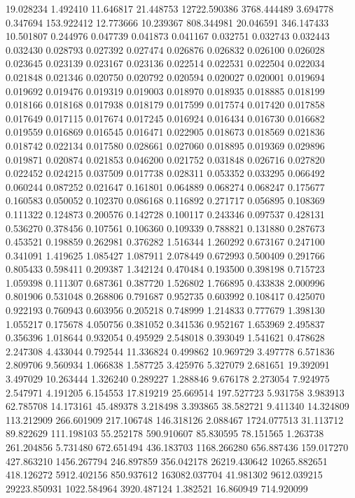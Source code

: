 19.028234
1.492410
11.646817
21.448753
12722.590386
3768.444489
3.694778
0.347694
153.922412
12.773666
10.239367
808.344981
20.046591
346.147433
10.501807
0.244976
0.047739
0.041873
0.041167
0.032751
0.032743
0.032443
0.032430
0.028793
0.027392
0.027474
0.026876
0.026832
0.026100
0.026028
0.023645
0.023139
0.023167
0.023136
0.022514
0.022531
0.022504
0.022034
0.021848
0.021346
0.020750
0.020792
0.020594
0.020027
0.020001
0.019694
0.019692
0.019476
0.019319
0.019003
0.018970
0.018935
0.018885
0.018199
0.018166
0.018168
0.017938
0.018179
0.017599
0.017574
0.017420
0.017858
0.017649
0.017115
0.017674
0.017245
0.016924
0.016434
0.016730
0.016682
0.019559
0.016869
0.016545
0.016471
0.022905
0.018673
0.018569
0.021836
0.018742
0.022134
0.017580
0.028661
0.027060
0.018895
0.019369
0.029896
0.019871
0.020874
0.021853
0.046200
0.021752
0.031848
0.026716
0.027820
0.022452
0.024215
0.037509
0.017738
0.028311
0.053352
0.033295
0.066492
0.060244
0.087252
0.021647
0.161801
0.064889
0.068274
0.068247
0.175677
0.160583
0.050052
0.102370
0.086168
0.116892
0.271717
0.056895
0.108369
0.111322
0.124873
0.200576
0.142728
0.100117
0.243346
0.097537
0.428131
0.536270
0.378456
0.107561
0.106360
0.109339
0.788821
0.131880
0.287673
0.453521
0.198859
0.262981
0.376282
1.516344
1.260292
0.673167
0.247100
0.341091
1.419625
1.085427
1.087911
2.078449
0.672993
0.500409
0.291766
0.805433
0.598411
0.209387
1.342124
0.470484
0.193500
0.398198
0.715723
1.059398
0.111307
0.687361
0.387720
1.526802
1.766895
0.433838
2.000996
0.801906
0.531048
0.268806
0.791687
0.952735
0.603992
0.108417
0.425070
0.922193
0.760943
0.603956
0.205218
0.748999
1.214833
0.777679
1.398130
1.055217
0.175678
4.050756
0.381052
0.341536
0.952167
1.653969
2.495837
0.356396
1.018644
0.932054
0.495929
2.548018
0.393049
1.541621
0.478628
2.247308
4.433044
0.792544
11.336824
0.499862
10.969729
3.497778
6.571836
2.809706
9.560934
1.066838
1.587725
3.425976
5.327079
2.681651
19.392091
3.497029
10.263444
1.326240
0.289227
1.288846
9.676178
2.273054
7.924975
2.547971
4.191205
6.154553
17.819219
25.669514
197.527723
5.931758
3.983913
62.785708
14.173161
45.489378
3.218498
3.393865
38.582721
9.411340
14.324809
113.212909
266.601909
217.106748
146.318126
2.088467
1724.077513
31.113712
89.822629
111.198103
55.252178
590.910607
85.830595
78.151565
1.263738
261.204856
5.731480
672.651494
436.183703
1168.266280
656.887436
159.017270
427.863210
1456.267794
246.897859
356.042178
26219.430642
10265.882651
418.126272
5912.402156
850.937612
163082.037704
41.981302
9612.039215
29223.850931
1022.584964
3920.487124
1.382521
16.860949
714.920099
